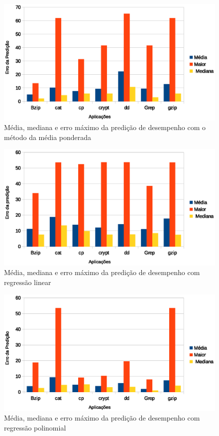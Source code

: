 \begin{figure}[!htb]
\centering
\includegraphics [keepaspectratio=true,scale=0.8]{graficos/mean_error.eps}
\caption{Média, mediana e erro máximo da predição de desempenho com o método da média ponderada}
\label{mean_error}
\end{figure}  

\begin{figure}[!htb]
\centering
\includegraphics [keepaspectratio=true,scale=0.8]{graficos/linear_error.eps}
\caption{Média, mediana e erro máximo da predição de desempenho com regressão linear}
\label{linear_error}
\end{figure}  

\begin{figure}[!htb]
\centering
\includegraphics [keepaspectratio=true,scale=0.8]{graficos/polinomial_error.eps}
\caption{Média, mediana e erro máximo da predição de desempenho com regressão polinomial}
\label{polinomial_error}
\end{figure}  

